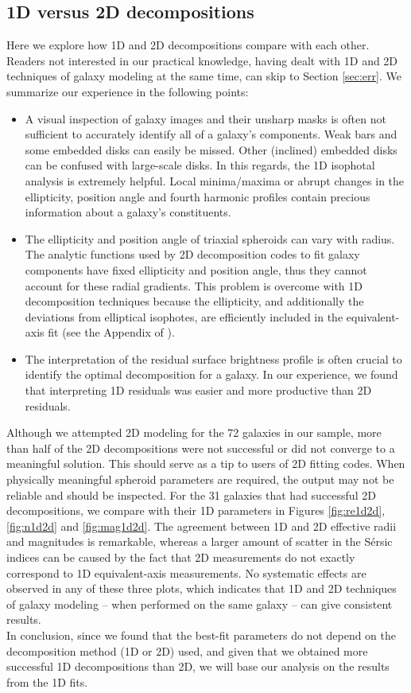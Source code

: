 \documentclass[preprint2]{emulateapj}
\begin{document}


\subsection{1D versus 2D decompositions}
Here we explore how 1D and 2D decompositions compare with each other. 
Readers not interested in our practical knowledge, 
having dealt with 1D and 2D techniques of galaxy modeling at the same time, can skip to Section \ref{sec:err}. 
We summarize our experience in the following points:
\begin{itemize}
\item A visual inspection of galaxy images and their unsharp masks is often not sufficient to accurately identify all of a galaxy's components. 
Weak bars and some embedded disks can easily be missed. 
Other (inclined) embedded disks can be confused with large-scale disks.
In this regards, the 1D isophotal analysis is extremely helpful. 
Local minima/maxima or abrupt changes in the ellipticity, position angle and fourth harmonic profiles contain precious information 
about a galaxy's constituents.
\item The ellipticity and position angle of triaxial spheroids can vary with radius.
The analytic functions used by 2D decomposition codes to fit galaxy components have fixed ellipticity and position angle, 
thus they cannot account for these radial gradients. 
This problem is overcome with 1D decomposition techniques 
because the ellipticity, and additionally the deviations from elliptical isophotes, 
are efficiently included in the equivalent-axis fit (see the Appendix of \citealt{ciambur2015}).
\item The interpretation of the residual surface brightness profile is often crucial to identify the optimal decomposition for a galaxy. 
In our experience, we found that interpreting 1D residuals was easier and more productive than 2D residuals.
\end{itemize}
Although we attempted 2D modeling for the 72 galaxies in our sample, 
more than half of the 2D decompositions were not successful or did not converge to a meaningful solution. 
This should serve as a tip to users of 2D fitting codes. 
When physically meaningful spheroid parameters are required, 
the output may not be reliable and should be inspected.
For the 31 galaxies that had successful 2D decompositions, 
we compare with their 1D parameters in Figures \ref{fig:re1d2d}, \ref{fig:n1d2d} and \ref{fig:mag1d2d}.
The agreement between 1D and 2D effective radii and magnitudes is remarkable, 
whereas a larger amount of scatter in the S\'ersic indices can be caused by the fact that 
2D measurements do not exactly correspond to 1D equivalent-axis measurements. 
No systematic effects are observed in any of these three plots, 
which indicates that 1D and 2D techniques of galaxy modeling -- when performed on the same galaxy -- 
can give consistent results. \\
In conclusion, since we found that the best-fit parameters do not depend on the decomposition method (1D or 2D) used, 
and given that we obtained more successful 1D decompositions than 2D, 
we will base our analysis on the results from the 1D fits.
\end{document}
